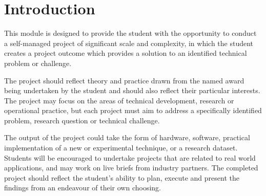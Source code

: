 \chapter{Introduction}

This module is designed to provide the student with the opportunity to conduct a self-managed project of significant scale and complexity, in which the student creates a project outcome which provides a solution to an identified technical problem or challenge.

The project should reflect theory and practice drawn from the named award being undertaken by the student and should also reflect their particular interests. The project may focus on the areas of technical development, research or operational practice, but each project must aim to address a specifically identified problem, research question or technical challenge.

The output of the project could take the form of hardware, software, practical implementation of a new or experimental technique, or a research dataset. Students will be encouraged to undertake projects that are related to real world applications, and may work on live briefs from industry partners. The completed project should reflect the student’s ability to plan, execute and present the findings from an endeavour of their own choosing.